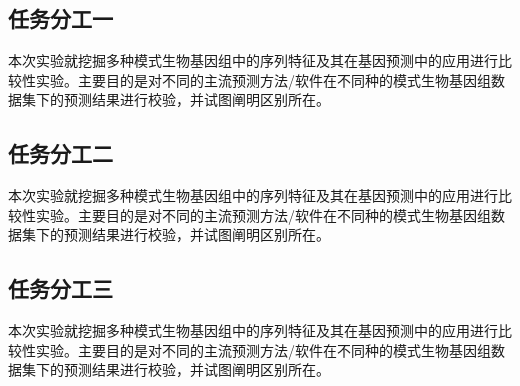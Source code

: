 \documentclass[12pt]{ctexart}
\begin{document}
    \subsection{任务分工一}
    本次实验就挖掘多种模式生物基因组中的序列特征及其在基因预测中的应用进行比较性实验。主要目的是对不同的主流预测方法/软件在不同种的模式生物基因组数据集下的预测结果进行校验，并试图阐明区别所在。
    
    \subsection{任务分工二}
    本次实验就挖掘多种模式生物基因组中的序列特征及其在基因预测中的应用进行比较性实验。主要目的是对不同的主流预测方法/软件在不同种的模式生物基因组数据集下的预测结果进行校验，并试图阐明区别所在。
    
    \subsection{任务分工三}
    本次实验就挖掘多种模式生物基因组中的序列特征及其在基因预测中的应用进行比较性实验。主要目的是对不同的主流预测方法/软件在不同种的模式生物基因组数据集下的预测结果进行校验，并试图阐明区别所在。





\end{document}
